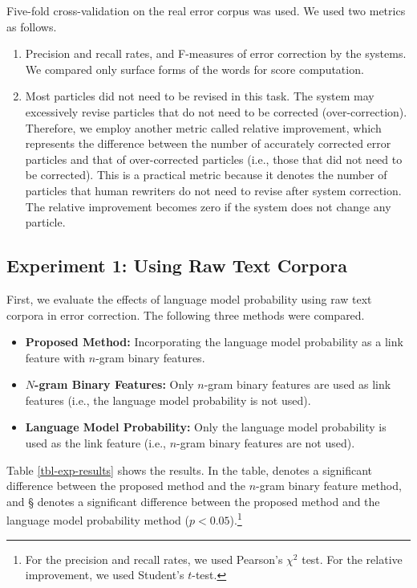 \documentclass[english]{jnlp_1.4_rep}
\begin{document}
Five-fold cross-validation on the real error corpus was used. We used
two metrics as follows.


\begin{enumerate}
\item Precision and recall rates, and F-measures of error correction
by the systems. We compared only surface forms of the words for score
computation.

\item Most particles did not need to be revised in this task. The
system may excessively revise particles that do not need to be
corrected (over-correction). Therefore, we employ another metric
called relative improvement, which represents the difference between
the number of accurately corrected error particles and that of
over-corrected particles (i.e., those that did not need to be
corrected). This is a practical metric because it denotes the number
of particles that human rewriters do not need to revise after system
correction. The relative improvement becomes zero if the system does
not change any particle.
\end{enumerate}


\subsection{Experiment 1: Using Raw Text Corpora}
\label{sec-exp-raw-corpora}

First, we evaluate the effects of language model probability using raw
text corpora in error correction. The following three methods were
compared.

\begin{itemize}
\item \textbf{Proposed Method:}
Incorporating the language model probability as a link feature with
$n$-gram binary features.

\item \textbf{$N$-gram Binary Features:}
Only $n$-gram binary features are used as link features (i.e., the
language model probability is not used).

\item \textbf{Language Model Probability:}
Only the language model probability is used as the link feature (i.e.,
$n$-gram binary features are not used).
\end{itemize}

Table \ref{tbl-exp-results} shows the results.  In the table,
\mbox{\dag} denotes a significant difference between the proposed
method and the $n$-gram binary feature method, and \mbox{\S} denotes a
significant difference between the proposed method and the language
model probability method ($p < 0.05$).\footnote{For the precision and
recall rates, we used Pearson's $\chi^2$ test.  For the relative
improvement, we used Student's $t$-test.}
\end{document}
